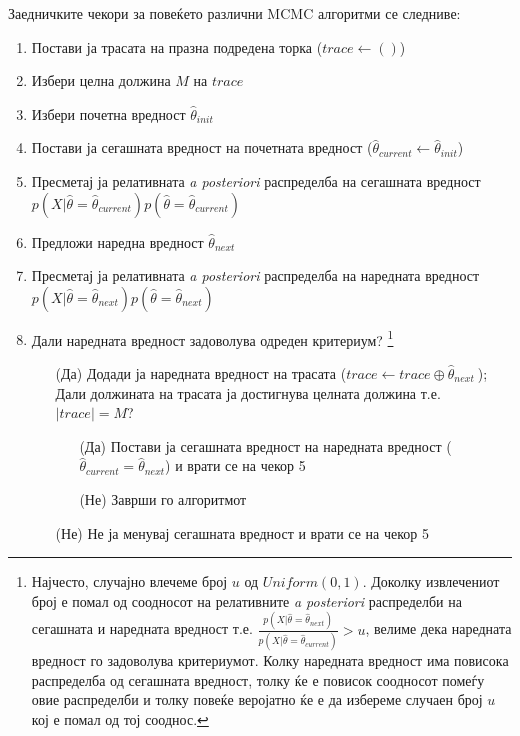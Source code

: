 \documentclass[12pt]{article}
\numberwithin{equation}{section}
\begin{document}
Заедничките чекори за повеќето различни MCMC алгоритми се следниве:

\begin{enumerate}
    \item Постави ја трасата на празна подредена торка (\(trace \leftarrow ()\))
    \item Избери целна должина \(M\) на \(trace\)
    \item Избери почетна вредност \(\widehat{\theta}_{init}\)
    \item Постави ја сегашната вредност на почетната вредност (\(\widehat{\theta}_{current} \leftarrow \widehat{\theta}_{init}\))
    \item Пресметај ја релативната \textit{a posteriori} распределба на сегашната вредност \(p(X|\widehat{\theta} = \widehat{\theta}_{current})p(\widehat{\theta} = \widehat{\theta}_{current})\)
    \item Предложи наредна вредност \(\widehat{\theta}_{next}\)
    \item Пресметај ја релативната \textit{a posteriori} распределба на наредната вредност \(p(X|\widehat{\theta} = \widehat{\theta}_{next})p(\widehat{\theta} = \widehat{\theta}_{next})\)
    \item Дали наредната вредност задоволува одреден критериум? \footnote{Најчесто, случајно влечеме број \(u\) од \(Uniform(0, 1)\). Доколку извлечениот број е помал од соодносот на релативните \textit{a posteriori} распределби на сегашната и наредната вредност т.е. \(\frac{p(X|\widehat{\theta} = \widehat{\theta}_{next})}{p(X|\widehat{\theta} = \widehat{\theta}_{current})} > u\), велиме дека наредната вредност го задоволува критериумот. Колку наредната вредност има повисока распределба од сегашната вредност, толку ќе е повисок соодносот помеѓу овие распределби и толку повеќе веројатно ќе е да избереме случаен број \(u\) кој е помал од тој сооднос.}
    \begin{enumerate}
        \item[(Да)] Додади ја наредната вредност на трасата (\(trace \leftarrow trace \oplus \widehat{\theta}_{next}\ \)); Дали должината на трасата ја достигнува целната должина т.е. \(|trace| = M\)?
        \begin{enumerate}
            \item[(Да)] Постави ја сегашната вредност на наредната вредност (\(\widehat{\theta}_{current} = \widehat{\theta}_{next}\)) и врати се на чекор 5
            \item[(Не)] Заврши го алгоритмот
        \end{enumerate}
        \item[(Не)] Не ја менувај сегашната вредност и врати се на чекор 5
    \end{enumerate}
\end{enumerate}
\end{document}
